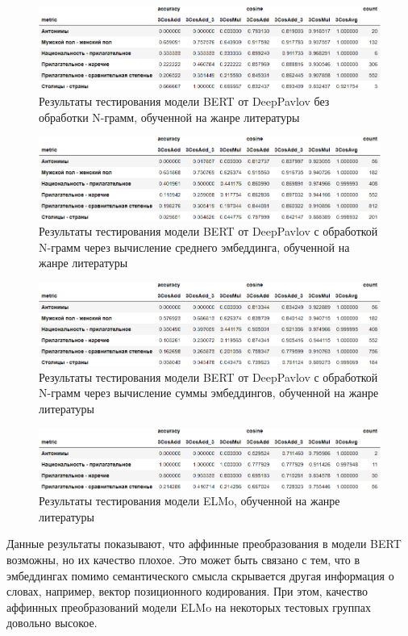 \documentclass[a4paper,14pt]{article}
\begin{document}
\begin{figure}[H]
	\centering
	\includegraphics[width=0.8\linewidth]{image/res_DeepPavlov-liter}
	\caption{Результаты тестирования модели BERT от DeepPavlov без обработки N-грамм, обученной на жанре литературы}
	\label{fig:resdeeppavlov-liter}
\end{figure}
\begin{figure}[H]
	\centering
	\includegraphics[width=0.8\linewidth]{image/res_DeepPavlov-liter_2}
	\caption{Результаты тестирования модели BERT от DeepPavlov с обработкой N-грамм через вычисление среднего эмбеддинга, обученной на жанре литературы}
	\label{fig:resdeeppavlov-liter2}
\end{figure}
\begin{figure}[H]
	\centering
	\includegraphics[width=0.8\linewidth]{image/res_DeepPavlov-liter_3}
	\caption{Результаты тестирования модели BERT от DeepPavlov с обработкой N-грамм через вычисление суммы эмбеддингов, обученной на жанре литературы}
	\label{fig:resdeeppavlov-liter3}
\end{figure}
\begin{figure}[H]
	\centering
	\includegraphics[width=0.8\linewidth]{image/res_elmo-DeepPavlov-liter}
	\caption{Результаты тестирования модели ELMo, обученной на жанре литературы}
	\label{fig:reselmo-deeppavlov-liter}
\end{figure}

Данные результаты показывают, что аффинные преобразования в модели BERT возможны, но их качество плохое.
Это может быть связано с тем, что в эмбеддингах помимо семантического смысла скрывается другая информация о словах, например, вектор позиционного кодирования.
При этом, качество аффинных преобразований модели ELMo на некоторых тестовых группах довольно высокое.
\end{document}
